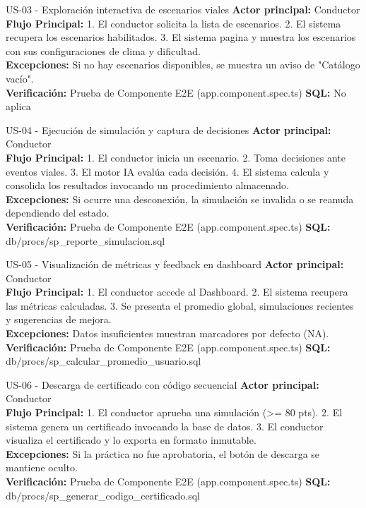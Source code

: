 \documentclass[11pt,a4paper]{article}
\begin{document}
\begin{requisito}{US-03 - Exploración interactiva de escenarios viales}
    \textbf{Actor principal:} Conductor\\[0.2cm]
    \textbf{Flujo Principal:} 1. El conductor solicita la lista de escenarios. 2. El sistema recupera los escenarios habilitados. 3. El sistema pagina y muestra los escenarios con sus configuraciones de clima y dificultad. \\[0.2cm]
    \textbf{Excepciones:} Si no hay escenarios disponibles, se muestra un aviso de "Catálogo vacío".\\[0.2cm]
    \textbf{Verificación:} Prueba de Componente E2E (app.component.spec.ts) \quad \textbf{SQL:} No aplica
\end{requisito}

\begin{requisito}{US-04 - Ejecución de simulación y captura de decisiones}
    \textbf{Actor principal:} Conductor\\[0.2cm]
    \textbf{Flujo Principal:} 1. El conductor inicia un escenario. 2. Toma decisiones ante eventos viales. 3. El motor IA evalúa cada decisión. 4. El sistema calcula y consolida los resultados invocando un procedimiento almacenado. \\[0.2cm]
    \textbf{Excepciones:} Si ocurre una desconexión, la simulación se invalida o se reanuda dependiendo del estado.\\[0.2cm]
    \textbf{Verificación:} Prueba de Componente E2E (app.component.spec.ts) \quad \textbf{SQL:} db/procs/sp\_reporte\_simulacion.sql
\end{requisito}

\begin{requisito}{US-05 - Visualización de métricas y feedback en dashboard}
    \textbf{Actor principal:} Conductor\\[0.2cm]
    \textbf{Flujo Principal:} 1. El conductor accede al Dashboard. 2. El sistema recupera las métricas calculadas. 3. Se presenta el promedio global, simulaciones recientes y sugerencias de mejora. \\[0.2cm]
    \textbf{Excepciones:} Datos insuficientes muestran marcadores por defecto (NA).\\[0.2cm]
    \textbf{Verificación:} Prueba de Componente E2E (app.component.spec.ts) \quad \textbf{SQL:} db/procs/sp\_calcular\_promedio\_usuario.sql
\end{requisito}

\begin{requisito}{US-06 - Descarga de certificado con código secuencial}
    \textbf{Actor principal:} Conductor\\[0.2cm]
    \textbf{Flujo Principal:} 1. El conductor aprueba una simulación (>= 80 pts). 2. El sistema genera un certificado invocando la base de datos. 3. El conductor visualiza el certificado y lo exporta en formato inmutable. \\[0.2cm]
    \textbf{Excepciones:} Si la práctica no fue aprobatoria, el botón de descarga se mantiene oculto.\\[0.2cm]
    \textbf{Verificación:} Prueba de Componente E2E (app.component.spec.ts) \quad \textbf{SQL:} db/procs/sp\_generar\_codigo\_certificado.sql
\end{requisito}
\end{document}
